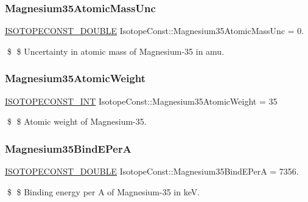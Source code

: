 \subsubsection{\texorpdfstring{Magnesium35\+Atomic\+Mass\+Unc}{Magnesium35AtomicMassUnc}}
{\footnotesize\ttfamily \mbox{\hyperlink{group___isotope_const-_macros_ga8f45a7272ce02c0b4c65c44636ed719a}{I\+S\+O\+T\+O\+P\+E\+C\+O\+N\+S\+T\+\_\+\+D\+O\+U\+B\+LE}} Isotope\+Const\+::\+Magnesium35\+Atomic\+Mass\+Unc = 0.}

\$ \$ Uncertainty in atomic mass of Magnesium-\/35 in amu. \mbox{\label{group___isotope_const-_magnesium-_mg35_ga6d72f26419876a72b031dcf028319aeb}} 
\subsubsection{\texorpdfstring{Magnesium35\+Atomic\+Weight}{Magnesium35AtomicWeight}}
{\footnotesize\ttfamily \mbox{\hyperlink{group___isotope_const-_macros_ga5f18360b3e99483a35c32d789e62621c}{I\+S\+O\+T\+O\+P\+E\+C\+O\+N\+S\+T\+\_\+\+I\+NT}} Isotope\+Const\+::\+Magnesium35\+Atomic\+Weight = 35}

\$ \$ Atomic weight of Magnesium-\/35. \mbox{\label{group___isotope_const-_magnesium-_mg35_ga3cb14b0bb6e9582d48c5e1baa1337326}} 
\subsubsection{\texorpdfstring{Magnesium35\+Bind\+E\+PerA}{Magnesium35BindEPerA}}
{\footnotesize\ttfamily \mbox{\hyperlink{group___isotope_const-_macros_ga8f45a7272ce02c0b4c65c44636ed719a}{I\+S\+O\+T\+O\+P\+E\+C\+O\+N\+S\+T\+\_\+\+D\+O\+U\+B\+LE}} Isotope\+Const\+::\+Magnesium35\+Bind\+E\+PerA = 7356.}

\$ \$ Binding energy per A of Magnesium-\/35 in keV. \mbox{\label{group___isotope_const-_magnesium-_mg35_ga29e317b743d4bfcc427283ab18474f7c}} 
